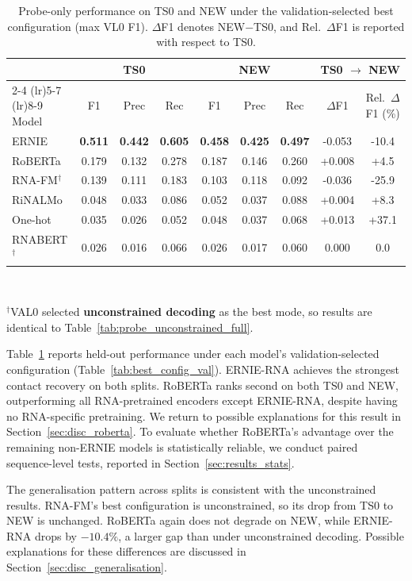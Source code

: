 \documentclass[logo,bsc,singlespacing,parskip]{infthesis}
\begin{document}
\begin{table}[H]
\centering
\caption{Probe-only performance on TS0 and NEW under the validation-selected best configuration (max VL0 F1).
$\Delta$F1 denotes NEW$-$TS0, and Rel.\ $\Delta$F1 is reported with respect to TS0.}
\label{tab:probe_best_full}
\begin{tabular}{lcccccccc}
\toprule
& \multicolumn{3}{c}{TS0} & \multicolumn{3}{c}{NEW} & \multicolumn{2}{c}{TS0 $\rightarrow$ NEW} \\
\cmidrule(lr){2-4} \cmidrule(lr){5-7} \cmidrule(lr){8-9}
Model & F1 & Prec & Rec & F1 & Prec & Rec & $\Delta$F1 & Rel.\ $\Delta$F1 (\%) \\
\midrule
ERNIE
& \textbf{0.511} & \textbf{0.442} & \textbf{0.605}
& \textbf{0.458} & \textbf{0.425} & \textbf{0.497}
& -0.053 & -10.4 \\
RoBERTa
& 0.179 & 0.132 & 0.278
& 0.187 & 0.146 & 0.260
& +0.008 & +4.5 \\
RNA-FM$^\dagger$
& 0.139 & 0.111 & 0.183
& 0.103 & 0.118 & 0.092
& -0.036 & -25.9 \\
RiNALMo
& 0.048 & 0.033 & 0.086
& 0.052 & 0.037 & 0.088
& +0.004 & +8.3 \\
One-hot
& 0.035 & 0.026 & 0.052
& 0.048 & 0.037 & 0.068
& +0.013 & +37.1 \\
RNABERT$^\dagger$
& 0.026 & 0.016 & 0.066
& 0.026 & 0.017 & 0.060
& 0.000 & 0.0 \\
\bottomrule
\end{tabular}\\[2pt]
{\raggedright\footnotesize $^\dagger$VAL0 selected \textbf{unconstrained decoding} as the best mode, so results are identical to Table~\ref{tab:probe_unconstrained_full}.\par}
\end{table}
\vspace{-1.0em}
Table~\ref{tab:probe_best_full} reports held-out performance under each model's validation-selected configuration (Table~\ref{tab:best_config_val}). ERNIE-RNA achieves the strongest contact recovery on both splits. RoBERTa ranks second on both TS0 and NEW, outperforming all RNA-pretrained encoders except ERNIE-RNA, despite having no RNA-specific pretraining. We return to possible explanations for this result in Section~\ref{sec:disc_roberta}. To evaluate whether RoBERTa's advantage over the remaining non-ERNIE models is statistically reliable, we conduct paired sequence-level tests, reported in Section~\ref{sec:results_stats}.

The generalisation pattern across splits is consistent with the unconstrained results. RNA-FM's best configuration is unconstrained, so its drop from TS0 to NEW is unchanged. RoBERTa again does not degrade on NEW, while ERNIE-RNA drops by $-10.4\%$, a larger gap than under unconstrained decoding. Possible explanations for these differences are discussed in Section~\ref{sec:disc_generalisation}.
\end{document}
